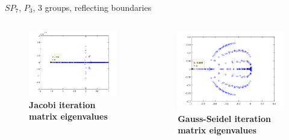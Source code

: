 \documentclass{beamer}
\begin{document}
\begin{frame}{$SP_7$, $P_3$, 3 groups, reflecting boundaries}

  \begin{columns}

    \begin{column}{0.5\textwidth}
      \begin{figure}[h!]
        \centering
        \includegraphics[width=2.5in,clip]{SPn7P3G3.png}
        \caption{\textbf{Jacobi iteration matrix eigenvalues}}
      \end{figure}
    \end{column}

    \begin{column}{0.5\textwidth}
      \begin{figure}[h!]
        \centering
        \includegraphics[width=2.5in,clip]{gsSPn7P3G3.png}
        \caption{\textbf{Gauss-Seidel iteration matrix eigenvalues}}
      \end{figure}
    \end{column}

  \end{columns}

\end{frame}

\end{document}
